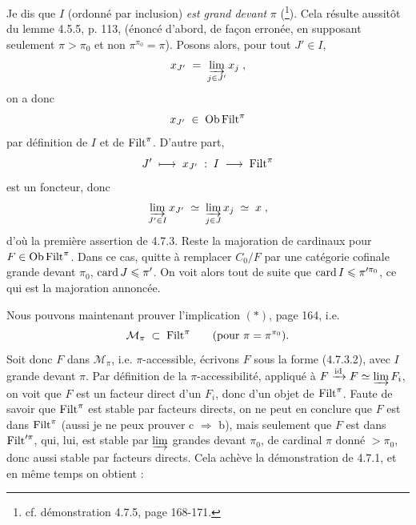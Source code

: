 
Je dis que $I$ (ordonné par inclusion) \textit{est grand devant} $\pi$ (\footnote[69]{cf. démonstration 4.7.5, page 168-171.}). Cela résulte aussitôt du lemme 4.5.5, p. 113, (énoncé d’abord, de façon erronée, en supposant seulement $\pi > \pi_0$ et non $\pi^{\pi_0} = \pi$). Posons alors, pour tout $J' \in I$,
\[
x_{J'} \;=\; \varinjlim_{j \in J'} x_j \;,
\]
on a donc
\[
x_{J'} \;\in\; \operatorname{Ob} \operatorname{Filt}^{\pi}
\]
par définition de $I$ et de $\operatorname{Filt}^{\pi}$. D’autre part,
\[
J' \;\longmapsto\; x_{J'} \;:\; I \;\longrightarrow\; \operatorname{Filt}^{\pi}
\]
est un foncteur, donc
\[
\varinjlim_{J' \in I} x_{J'} \;\simeq\; \varinjlim_{j \in J} x_j \;\simeq\; x \;, %
\]
d’où la première assertion de 4.7.3. Reste la majoration de cardinaux pour $F \in \operatorname{Ob} \operatorname{Filt}^{\pi}$. Dans ce cas, quitte à remplacer $C_0/F$ par une catégorie cofinale grande devant $\pi_0$, $\operatorname{card} J \leqslant \pi'$. On voit alors tout de suite que $\operatorname{card} I \leqslant \pi'^{\pi_0}$, ce qui est la majoration annoncée.

Nous pouvons maintenant prouver l’implication $(*)$, page 164, i.e.
\[
\mathcal{M}_{\pi} \;\subset\; \operatorname{Filt}^{\pi} \qquad (\text{pour } \pi = \pi^{\pi_0}).
\]
Soit donc $F$ dans $\mathcal{M}_{\pi}$, i.e. $\pi$-accessible, écrivons $F$ sous la forme (4.7.3.2), avec $I$ grande devant $\pi$. Par définition de la $\pi$-accessibilité, appliqué à $F \xrightarrow{\mathrm{id}} F \simeq \varinjlim F_i$, on voit que $F$ est un facteur direct d’un $F_i$, donc d’un objet de $\operatorname{Filt}^{\pi}$. Faute de savoir que $\operatorname{Filt}^{\pi}$ est stable par facteurs directs, on ne peut en conclure que $F$ est dans $\operatorname{Filt}^{\pi}$ (aussi je ne peux prouver c $\Longrightarrow$ b), mais seulement que $F$ est dans $\operatorname{Filt}'^{\pi}$, qui, lui, est stable par $\varinjlim$ grandes devant $\pi_0$, de cardinal $\pi$ donné $> \pi_0$, donc aussi  stable par facteurs directs. Cela achève la démonstration de 4.7.1, et en même temps on obtient :

